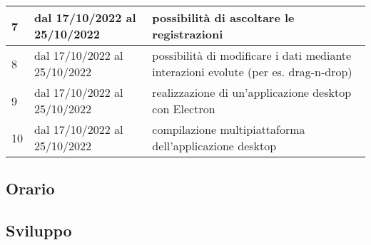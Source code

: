\begin{center}
\begin{tabular}{ |p{1cm}|p{}|p{}| }
    \hline
    7                                        & dal 17/10/2022 al 25/10/2022 & possibilità di ascoltare le registrazioni                                           \\
    \hline
    8                                        & dal 17/10/2022 al 25/10/2022 & possibilità di modificare i dati mediante interazioni evolute (per es. drag-n-drop) \\
    \hline
    9                                        & dal 17/10/2022 al 25/10/2022 & realizzazione di un'applicazione desktop con Electron                               \\
    \hline
    10                                       & dal 17/10/2022 al 25/10/2022 & compilazione multipiattaforma dell'applicazione desktop                             \\
    \hline
  \end{tabular}
\end{center}

\subsection*{Orario}

\subsection*{Sviluppo}

